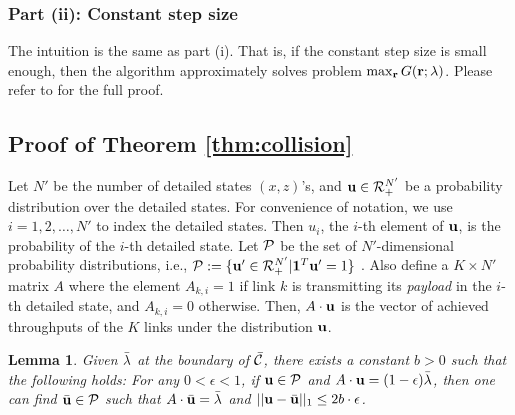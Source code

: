 \documentclass{IEEEtran}
\newtheorem{lemma}{Lemma}
\begin{document}
\subsubsection{Part (ii): Constant step size}

The intuition is the same as part (i). That is, if the constant step
size is small enough, then the algorithm approximately solves problem
$\max_{{\bf r}}G({\bf r};{\bf \lambda})$. Please refer to \cite{longer_version}
for the full proof.


\subsection{Proof of Theorem \ref{thm:collision}}

Let $N'$ be the number of detailed states $(x,z)$'s, and ${\bf u}\in{\cal R}_{+}^{N'}$
be a probability distribution over the detailed states. For convenience
of notation, we use $i=1,2,\dots,N'$ to index the detailed states.
Then $u_{i}$, the $i$-th element of ${\bf u}$, is the probability
of the $i$-th detailed state. Let ${\cal P}$ be the set of $N'$-dimensional
probability distributions, i.e., ${\cal P}:=\{{\bf u}'\in{\cal R}_{+}^{N'}|{\bf 1}^{T}{\bf u}'=1\}$
. Also define a $K\times N'$ matrix $A$ where the element $A_{k,i}=1$
if link $k$ is transmitting its \emph{payload} in the $i$-th detailed
state, and $A_{k,i}=0$ otherwise. Then, $A\cdot{\bf u}$ is the vector
of achieved throughputs of the $K$ links under the distribution ${\bf u}$.
\begin{lemma}
\label{lem:lip}Given $\bar{{\bf \lambda}}$ at the boundary of $\bar{{\cal C}}$,
there exists a constant $b>0$ such that the following holds: For
any $0<\epsilon<1$, if ${\bf u}\in{\cal P}$ and $A\cdot{\bf u}=(1-\epsilon)\bar{{\bf \lambda}}$,
then one can find $\bar{{\bf u}}\in{\cal P}$ such that $A\cdot\bar{{\bf u}}=\bar{{\bf \lambda}}$
and $||{\bf u}-\bar{{\bf u}}||_{1}\le2b\cdot\epsilon$.\end{lemma}
\end{document}
